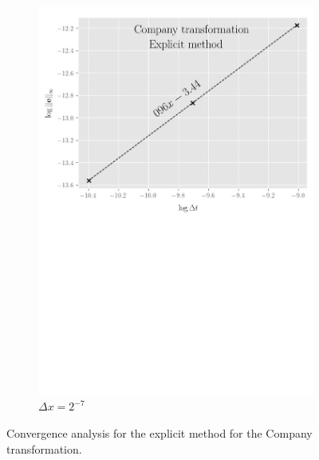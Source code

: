\begin{figure}[tbp]
\begin{subfigure}{0.4\textwidth}
    \includegraphics[width=\textwidth]{chapters/chapter3/ConvergenceTimeExplicitCompany.pdf}
    \caption{$\Delta{t}=2^{-15},2^{-17},\dots,2^{-21}$}
    \caption*{$\Delta{x}=2^{-7}$}
    \label{fig:finitedifferencesschemes:numericaresults:company_explicit_time}
  \end{subfigure}
  \caption{Convergence analysis for the explicit method for the Company transformation.}
  \label{fig:finitedifferencesschemes:numericaresults:company_convergence analysis}
\end{figure}